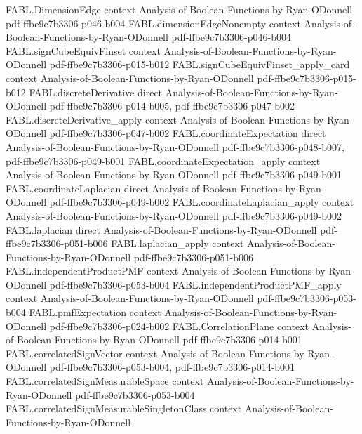 \begin{theorem}
  {FABL.DimensionEdge}
  {context}
  {Analysis-of-Boolean-Functions-by-Ryan-ODonnell}
  {pdf-ffbe9c7b3306-p046-b004}
\proofstep
  {FABL.dimensionEdgeNonempty}
  {context}
  {Analysis-of-Boolean-Functions-by-Ryan-ODonnell}
  {pdf-ffbe9c7b3306-p046-b004}
\proofstep
  {FABL.signCubeEquivFinset}
  {context}
  {Analysis-of-Boolean-Functions-by-Ryan-ODonnell}
  {pdf-ffbe9c7b3306-p015-b012}
\proofstep
  {FABL.signCubeEquivFinset_apply_card}
  {context}
  {Analysis-of-Boolean-Functions-by-Ryan-ODonnell}
  {pdf-ffbe9c7b3306-p015-b012}
\proofstep
  {FABL.discreteDerivative}
  {direct}
  {Analysis-of-Boolean-Functions-by-Ryan-ODonnell}
  {pdf-ffbe9c7b3306-p014-b005,
    pdf-ffbe9c7b3306-p047-b002}
\proofstep
  {FABL.discreteDerivative_apply}
  {context}
  {Analysis-of-Boolean-Functions-by-Ryan-ODonnell}
  {pdf-ffbe9c7b3306-p047-b002}
\proofstep
  {FABL.coordinateExpectation}
  {direct}
  {Analysis-of-Boolean-Functions-by-Ryan-ODonnell}
  {pdf-ffbe9c7b3306-p048-b007,
    pdf-ffbe9c7b3306-p049-b001}
\proofstep
  {FABL.coordinateExpectation_apply}
  {context}
  {Analysis-of-Boolean-Functions-by-Ryan-ODonnell}
  {pdf-ffbe9c7b3306-p049-b001}
\proofstep
  {FABL.coordinateLaplacian}
  {direct}
  {Analysis-of-Boolean-Functions-by-Ryan-ODonnell}
  {pdf-ffbe9c7b3306-p049-b002}
\proofstep
  {FABL.coordinateLaplacian_apply}
  {context}
  {Analysis-of-Boolean-Functions-by-Ryan-ODonnell}
  {pdf-ffbe9c7b3306-p049-b002}
\proofstep
  {FABL.laplacian}
  {direct}
  {Analysis-of-Boolean-Functions-by-Ryan-ODonnell}
  {pdf-ffbe9c7b3306-p051-b006}
\proofstep
  {FABL.laplacian_apply}
  {context}
  {Analysis-of-Boolean-Functions-by-Ryan-ODonnell}
  {pdf-ffbe9c7b3306-p051-b006}
\proofstep
  {FABL.independentProductPMF}
  {context}
  {Analysis-of-Boolean-Functions-by-Ryan-ODonnell}
  {pdf-ffbe9c7b3306-p053-b004}
\proofstep
  {FABL.independentProductPMF_apply}
  {context}
  {Analysis-of-Boolean-Functions-by-Ryan-ODonnell}
  {pdf-ffbe9c7b3306-p053-b004}
\proofstep
  {FABL.pmfExpectation}
  {context}
  {Analysis-of-Boolean-Functions-by-Ryan-ODonnell}
  {pdf-ffbe9c7b3306-p024-b002}
\proofstep
  {FABL.CorrelationPlane}
  {context}
  {Analysis-of-Boolean-Functions-by-Ryan-ODonnell}
  {pdf-ffbe9c7b3306-p014-b001}
\proofstep
  {FABL.correlatedSignVector}
  {context}
  {Analysis-of-Boolean-Functions-by-Ryan-ODonnell}
  {pdf-ffbe9c7b3306-p053-b004,
    pdf-ffbe9c7b3306-p014-b001}
\proofstep
  {FABL.correlatedSignMeasurableSpace}
  {context}
  {Analysis-of-Boolean-Functions-by-Ryan-ODonnell}
  {pdf-ffbe9c7b3306-p053-b004}
\proofstep
  {FABL.correlatedSignMeasurableSingletonClass}
  {context}
  {Analysis-of-Boolean-Functions-by-Ryan-ODonnell}

\end{theorem}
